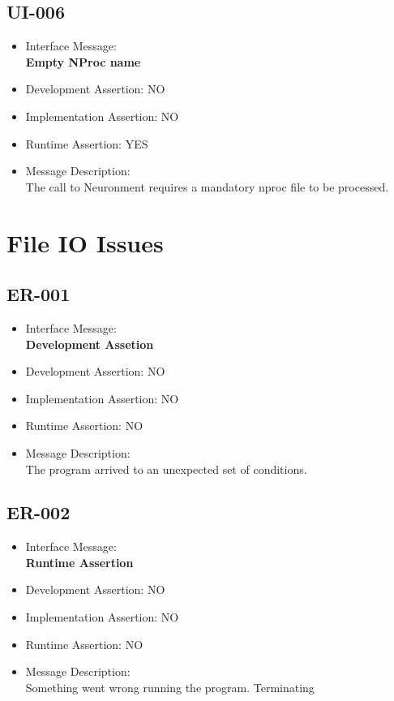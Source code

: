 \subsection{UI-006}
\begin{itemize}
  \item Interface Message:\\[1em]
    \textbf{Empty NProc name}
  \item Development Assertion: NO
  \item Implementation Assertion: NO
  \item Runtime Assertion: YES
  \item Message Description:\\[1em]
    The call to Neuronment requires a mandatory nproc file to be processed.
\end{itemize}

\section{File IO Issues}

\subsection{ER-001}
\begin{itemize}
  \item Interface Message:\\[1em]
    \textbf{Development Assetion}
  \item Development Assertion: NO
  \item Implementation Assertion: NO
  \item Runtime Assertion: NO
  \item Message Description:\\[1em]
    The program arrived to an unexpected set of conditions.
\end{itemize}

\subsection{ER-002}
\begin{itemize}
  \item Interface Message:\\[1em]
    \textbf{Runtime Assertion}
  \item Development Assertion: NO
  \item Implementation Assertion: NO
  \item Runtime Assertion: NO
  \item Message Description:\\[1em]
    Something went wrong running the program. Terminating
\end{itemize}

